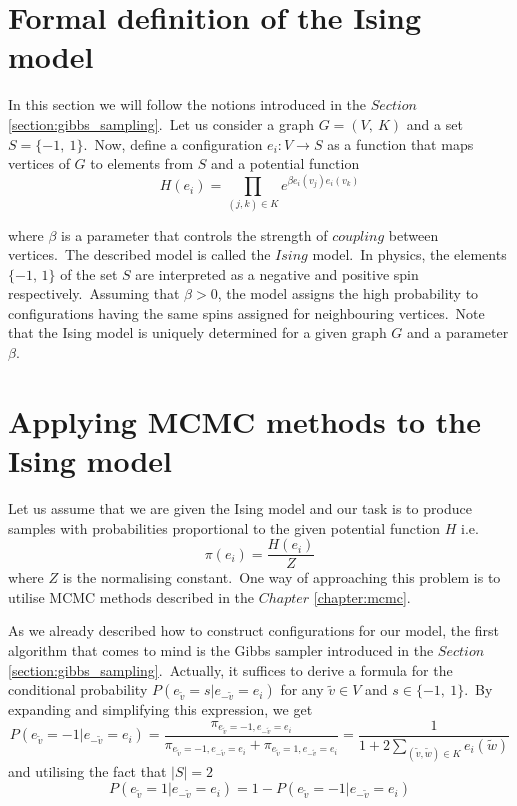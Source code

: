 \documentclass[a4paper, 11pt, onecolumn, openany, titlepage]{report}
\theoremstyle{default_theorem_style}\newtheorem{theorem}{Theorem}
\theoremstyle{default_theorem_style}\newtheorem{definition}{Definition}
\begin{document}
\section{Formal definition of the Ising model}

In this section we will follow the notions introduced in the $Section$ \ref{section:gibbs_sampling}.\ Let us consider
a graph $G = (V,\ K)$ and a set $S = \{-1,\ 1\}$.\ Now, define a configuration $e_i : V \to S$ as a function that
maps vertices of $G$ to elements from $S$ and a potential function
$$
H(e_i) = \prod\limits_{(j, k) \in K} e^{\beta e_i(v_j)e_i(v_k)}
$$

where $\beta$ is a parameter that controls the strength of $coupling$ between vertices.\ The described model is called
the $Ising$ model.\ In physics, the elements $\{-1, \, 1\}$ of the set $S$ are interpreted as a negative and positive
spin respectively.\ Assuming that $\beta > 0$, the model assigns the high probability to configurations having the
same spins assigned for neighbouring vertices.\ Note that the Ising model is uniquely determined for a given graph
$G$ and a parameter $\beta$.

\section{Applying MCMC methods to the Ising model}

Let us assume that we are given the Ising model and our task is to produce samples with probabilities proportional to
the given potential function $H$ i.e.
$$
\pi(e_i) = \frac{H(e_i)}{Z}
$$
where $Z$ is the normalising constant.\ One way of approaching this problem is to utilise MCMC methods described in
the $Chapter$ \ref{chapter:mcmc}.\newline

As we already described how to construct configurations for our model, the first algorithm that comes to mind is
the Gibbs sampler introduced in the $Section$ \ref{section:gibbs_sampling}.\ Actually, it suffices to derive a formula
for the conditional probability $P(e_{\tilde{v}} = s | e_{-\tilde{v}} = e_i)$ for any $\tilde{v} \in V$ and
$s \in \{-1,\ 1\}$.\ By expanding and simplifying this expression, we get
$$
P(e_{\tilde{v}} = -1 | e_{-\tilde{v}} = e_i) =
\frac{\pi_{e_{\tilde{v}} = -1,e_{-\tilde{v}} = e_i}}
{\pi_{e_{\tilde{v}} = -1,e_{-\tilde{v}} = e_i} + \pi_{e_{\tilde{v}} = 1,e_{-\tilde{v}} = e_i}} =
\frac{1}{1 + 2 \sum\limits_{(\tilde{v}, \tilde{w}) \in K} e_i(\tilde{w})}
$$
and utilising the fact that $|S| = 2$
$$
P(e_{\tilde{v}} = 1 | e_{-\tilde{v}} = e_i) = 1 - P(e_{\tilde{v}} = -1 | e_{-\tilde{v}} = e_i)
$$
\end{document}
